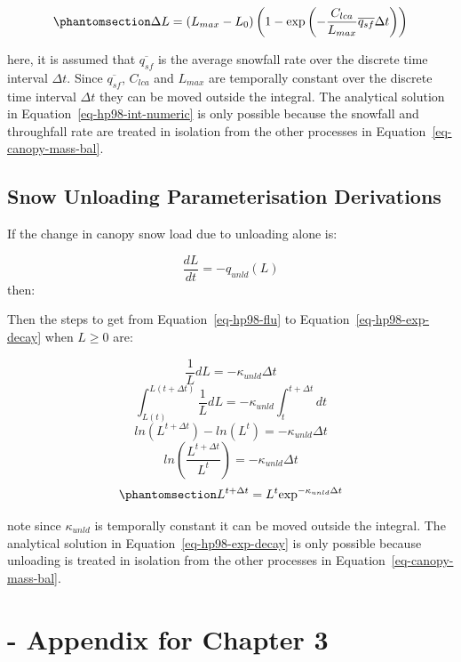 \documentclass[
  letterpaper,
]{tex/uofsthesis-cs}
\begin{document}
\begin{equation}\phantomsection\label{eq-interception-integration-steps}{\Delta L = (L_{max}-L_0)\left(1- \text{exp} \left(-\frac{C_{lca}}{L_{max}} \overline{q_{sf}} \Delta t \right) \right)}\end{equation}

here, it is assumed that \(\overline{q_{sf}}\) is the average snowfall
rate over the discrete time interval \(\Delta t\). Since
\(\overline{q_{sf}}\), \(C_{lca}\) and \(L_{max}\) are temporally
constant over the discrete time interval \(\Delta t\) they can be moved
outside the integral. The analytical solution in
Equation~\ref{eq-hp98-int-numeric} is only possible because the snowfall
and throughfall rate are treated in isolation from the other processes
in Equation~\ref{eq-canopy-mass-bal}.

\section{Snow Unloading Parameterisation
Derivations}\label{snow-unloading-parameterisation-derivations}

If the change in canopy snow load due to unloading alone is:

\[
 \frac{d L}{d t} =-q_{unld}(L)
\] then:

Then the steps to get from Equation~\ref{eq-hp98-flu} to
Equation~\ref{eq-hp98-exp-decay} when \(L \ge 0\) are:

\[\frac{1}{L} d L = -\kappa_{unld} \Delta t\]
\[\int^{L(t+\Delta t)}_{L(t)}\frac{1}{L} dL = -\kappa_{unld}\int^{t+\Delta t}_tdt \]
\[ln(L^{t+\Delta t}) - ln(L^t) = -\kappa_{unld} \Delta t \]
\[ ln \left( \frac{L^{t+\Delta t}}{L^t}\right) = -\kappa_{unld}\Delta t\]
\begin{equation}\phantomsection\label{eq-unloading-integration-steps}{L^{t+\Delta t} = L^t \text{exp}^{-\kappa_{unld} \Delta t}}\end{equation}

note since \(\kappa_{unld}\) is temporally constant it can be moved
outside the integral. The analytical solution in
Equation~\ref{eq-hp98-exp-decay} is only possible because unloading is
treated in isolation from the other processes in
Equation~\ref{eq-canopy-mass-bal}.

\pagebreak

\chapter{- Appendix for Chapter 3}\label{sec-appdx-ch3}
\end{document}
